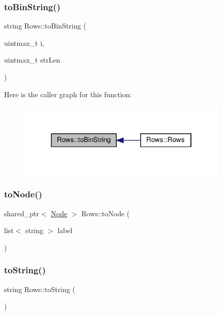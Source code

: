 \subsubsection{\texorpdfstring{to\+Bin\+String()}{toBinString()}}
{\footnotesize\ttfamily string Rows\+::to\+Bin\+String (\begin{DoxyParamCaption}\item[{uintmax\+\_\+t}]{i,  }\item[{uintmax\+\_\+t}]{str\+Len }\end{DoxyParamCaption})\hspace{0.3cm}{\ttfamily [private]}}

Here is the caller graph for this function\+:\nopagebreak
\begin{figure}[H]
\begin{center}
\leavevmode
\includegraphics[width=286pt]{d6/d54/class_rows_aa610ff44d051eededf3c25928987bb81_icgraph}
\end{center}
\end{figure}
\mbox{\label{class_rows_a22f5ff0d92c58ac650fd337d8f0a7894}} 
\subsubsection{\texorpdfstring{to\+Node()}{toNode()}}
{\footnotesize\ttfamily shared\+\_\+ptr$<$ \hyperlink{class_node}{Node} $>$ Rows\+::to\+Node (\begin{DoxyParamCaption}\item[{list$<$ string $>$}]{label }\end{DoxyParamCaption})}

\mbox{\label{class_rows_af097985562c1e8137014839519898494}} 
\subsubsection{\texorpdfstring{to\+String()}{toString()}}
{\footnotesize\ttfamily string Rows\+::to\+String (\begin{DoxyParamCaption}{ }\end{DoxyParamCaption})}



